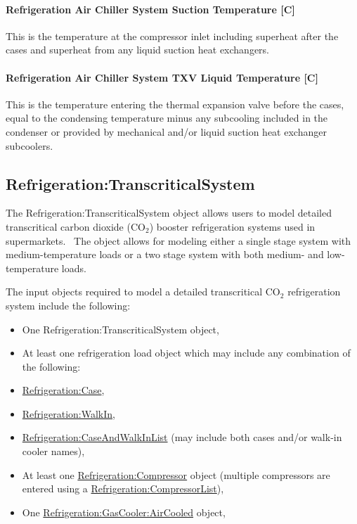 \paragraph{Refrigeration Air Chiller System Suction Temperature {[}C{]}}\label{refrigeration-air-chiller-system-suction-temperature-c}

This is the temperature at the compressor inlet including superheat after the cases and superheat from any liquid suction heat exchangers.

\paragraph{Refrigeration Air Chiller System TXV Liquid Temperature {[}C{]}}\label{refrigeration-air-chiller-system-txv-liquid-temperature-c}

This is the temperature entering the thermal expansion valve before the cases, equal to the condensing temperature minus any subcooling included in the condenser or provided by mechanical and/or liquid suction heat exchanger subcoolers.

\subsection{Refrigeration:TranscriticalSystem}\label{refrigerationtranscriticalsystem}

The Refrigeration:TranscriticalSystem object allows users to model detailed transcritical carbon dioxide (CO\(_{2}\)) booster refrigeration systems used in supermarkets.~ The object allows for modeling either a single stage system with medium-temperature loads or a two stage system with both medium- and low-temperature loads.

The input objects required to model a detailed transcritical CO\(_{2}\) refrigeration system include the following:

\begin{itemize}
\item
  One Refrigeration:TranscriticalSystem object,
\item
  At least one refrigeration load object which may include any combination of the following:
\item
  \hyperref[refrigerationcase]{Refrigeration:Case},
\item
  \hyperref[refrigerationwalkin]{Refrigeration:WalkIn},
\item
  \hyperref[refrigerationcaseandwalkinlist]{Refrigeration:CaseAndWalkInList} (may include both cases and/or walk-in cooler names),
\item
  At least one \hyperref[refrigerationcompressor]{Refrigeration:Compressor} object (multiple compressors are entered using a \hyperref[refrigerationcompressorlist]{Refrigeration:CompressorList}),
\item
  One \hyperref[refrigerationgascooleraircooled]{Refrigeration:GasCooler:AirCooled} object,
\end{itemize}

